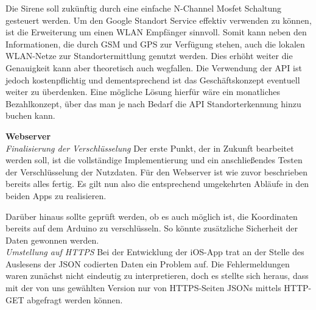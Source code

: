 Die Sirene soll zukünftig durch eine einfache N-Channel Mosfet Schaltung gesteuert werden.
Um den Google Standort Service effektiv verwenden zu können, ist die Erweiterung um einen WLAN Empfänger sinnvoll. Somit kann neben den Informationen, die durch GSM und GPS zur Verfügung stehen, auch die lokalen WLAN-Netze zur Standortermittlung genutzt werden. Dies erhöht weiter die Genauigkeit kann aber theoretisch auch wegfallen. Die Verwendung der API ist jedoch kostenpflichtig und dementsprechend ist das Geschäftskonzept eventuell weiter zu überdenken. Eine mögliche Lösung hierfür wäre ein monatliches Bezahlkonzept, über das man je nach Bedarf die API Standorterkennung hinzu buchen kann.




\textbf{Webserver} 
\\
\textit{Finalisierung der Verschlüsselung}
Der erste Punkt, der in Zukunft bearbeitet werden soll, ist die vollständige Implementierung und ein anschließendes Testen der Verschlüsselung der Nutzdaten. Für den Webserver ist wie zuvor beschrieben bereits alles fertig. Es gilt nun also die entsprechend umgekehrten Abläufe in den beiden Apps zu realisieren.

Darüber hinaus sollte geprüft werden, ob es auch möglich ist, die Koordinaten bereits auf dem Arduino zu verschlüsseln. So könnte zusätzliche Sicherheit der Daten gewonnen werden.
\\
\textit{Umstellung auf HTTPS}
Bei der Entwicklung der iOS-App trat an der Stelle des Auslesens der JSON codierten Daten ein Problem auf. Die Fehlermeldungen waren zunächst nicht eindeutig zu interpretieren, doch es stellte sich heraus, dass mit der von uns gewählten Version nur von HTTPS-Seiten JSONs mittels HTTP-GET abgefragt werden können.

